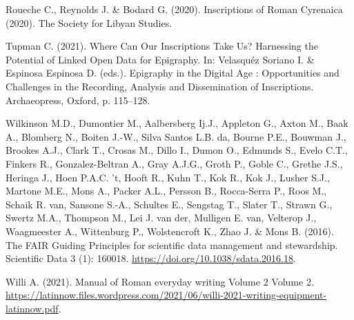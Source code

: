 \documentclass[
  12pt,
]{scrreprt}
\newlength{\cslhangindent}
\newlength{\cslentryspacingunit} %
\newenvironment{CSLReferences}[2] %
 {%
  \setlength{\parindent}{0pt}
  \ifodd #1
  \let\oldpar\par
  \def\par{\hangindent=\cslhangindent\oldpar}
  \fi
  \setlength{\parskip}{#2\cslentryspacingunit}
 }%
 {}
\begin{document}
\begin{CSLReferences}{1}{0}
\leavevmode{}%
Roueche C., Reynolds J. \& Bodard G. (2020). Inscriptions of {Roman}
{Cyrenaica} (2020). The Society for Libyan Studies.

\leavevmode{}%
Tupman C. (2021). Where {Can} {Our} {Inscriptions} {Take} {Us}?
{Harnessing} the {Potential} of {Linked} {Open} {Data} for {Epigraphy}.
In: Velasquéz Soriano I. \& Espinosa Espinosa D. (eds.). Epigraphy in
the {Digital} {Age} : {Opportunities} and {Challenges} in the
{Recording}, {Analysis} and {Dissemination} of {Inscriptions}.
Archaeopress, Oxford, p. 115--128.

\leavevmode{}%
Wilkinson M.D., Dumontier M., Aalbersberg Ij.J., Appleton G., Axton M.,
Baak A., Blomberg N., Boiten J.-W., Silva Santos L.B. da, Bourne P.E.,
Bouwman J., Brookes A.J., Clark T., Crosas M., Dillo I., Dumon O.,
Edmunds S., Evelo C.T., Finkers R., Gonzalez-Beltran A., Gray A.J.G.,
Groth P., Goble C., Grethe J.S., Heringa J., Hoen P.A.C. 't, Hooft R.,
Kuhn T., Kok R., Kok J., Lusher S.J., Martone M.E., Mons A., Packer
A.L., Persson B., Rocca-Serra P., Roos M., Schaik R. van, Sansone S.-A.,
Schultes E., Sengstag T., Slater T., Strawn G., Swertz M.A., Thompson
M., Lei J. van der, Mulligen E. van, Velterop J., Waagmeester A.,
Wittenburg P., Wolstencroft K., Zhao J. \& Mons B. (2016). The {FAIR}
{Guiding} {Principles} for scientific data management and stewardship.
Scientific Data 3 (1): 160018.
\url{https://doi.org/10.1038/sdata.2016.18}.

\leavevmode{}%
Willi A. (2021). Manual of {Roman} everyday writing {Volume} 2 {Volume}
2.
\url{https://latinnow.files.wordpress.com/2021/06/willi-2021-writing-equipment-latinnow.pdf}.

\end{CSLReferences}
\end{document}
